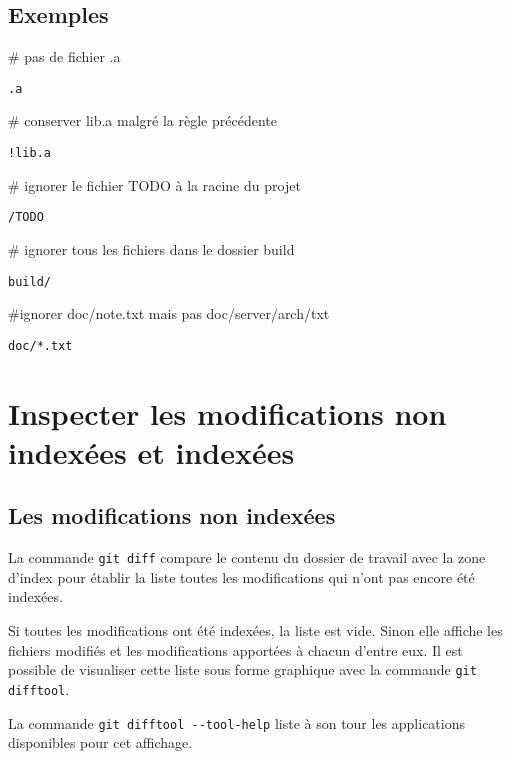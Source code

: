 \documentclass[11pt,twoside,headings=normal,open=right,french,DIV=12]{scrreprt}
\newcommand{\spec}[1]{\texttt{#1}}
\begin{document}
\subsection{Exemples}



    \begin{description}       
	    \item \# pas de fichier .a
		\item \spec{.a}
        \item \# conserver lib.a malgré la règle précédente
		\item \spec{!lib.a}
        \item \# ignorer le fichier TODO à la racine du projet
		\item \spec{/TODO}
	    \item \# ignorer tous les fichiers dans le dossier build
		\item \spec{build/}
		\item \#ignorer doc/note.txt mais pas doc/server/arch/txt
		\item \spec{doc/*.txt}
    \end{description}

	
	
	
\section{Inspecter les modifications non indexées et indexées}



\subsection{Les modifications non indexées}



    La commande \verb|git diff| compare le contenu du dossier de travail avec la zone d'index pour établir la liste toutes les modifications qui n'ont pas encore été indexées.
    
    \smallskip
    
    Si toutes les modifications ont été indexées, la liste est vide. Sinon elle affiche les fichiers modifiés et les modifications apportées à chacun d'entre eux. Il est possible de visualiser cette liste sous forme graphique avec la commande \verb|git difftool|.
    
La commande \verb|git difftool --tool-help|
    liste à son tour les applications disponibles pour cet affichage.
\end{document}
